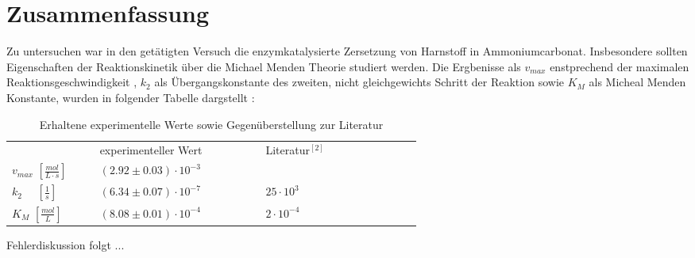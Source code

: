 %

 
%
\section{Zusammenfassung}
Zu untersuchen war in den getätigten Versuch die enzymkatalysierte Zersetzung von Harnstoff in Ammoniumcarbonat. Insbesondere sollten Eigenschaften der Reaktionskinetik über die Michael Menden Theorie studiert werden. Die Ergbenisse als $v_{max}$ enstprechend der maximalen Reaktionsgeschwindigkeit , $k_2$ als Übergangskonstante des zweiten, nicht gleichgewichts Schritt der Reaktion sowie $K_M$ als Micheal Menden Konstante, wurden in folgender Tabelle dargstellt :
\begin{table}[H]
	\centering
	\label{Erg}
	\caption{Erhaltene experimentelle Werte sowie Gegenüberstellung zur Literatur}
	\renewcommand*{\arraystretch}{1.4}
	\begin{tabular}{C{0.1\linewidth}|C{0.25\linewidth}C{0.25\linewidth}}
				& experimenteller Wert & Literatur$^{[2]}$ \\
		$ v_{max}\,\, [\si{\frac{mol}{L\cdot s}}] $ & $(2.92 \pm 0.03) \cdot 10^{-3}$ &   \\
		$k_2\,\,\,\,\,\,\,\, [\si{\frac{1}{s}}]$ & $(6.34 \pm 0.07)\cdot 10^{-7}$ &  $25 \cdot 10^3$\\
		$K_M\,\, [\si{\frac{mol}{L}}]$& $(8.08 \pm 0.01) \cdot 10^{-4}$& $2 \cdot 10^{-4}$\\
	\end{tabular}
\end{table}
Fehlerdiskussion folgt ...

%



